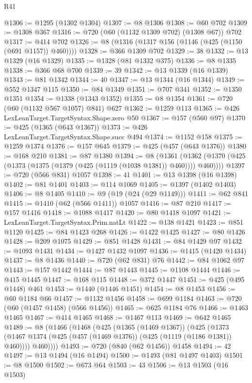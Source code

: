 \begin{lexlean}{R41}
\begin{coremodule}
{{{{{{{{{{{{{{{{{{{{{{{{{{{{{{{{{{{{{{{{{{{{{{{{{{{{{{{{{{{{{{{{{{{{{{{{{{{{{{{{{{{{{{{@1306 := @1295 (@1302 @1304)
@1307 := @8 @1306
@1308 := @60 @702
@1309 := @1308 @367
@1316 := @720 (@60 (@1132 @1309 @702) (@1308 @67)) @702
@1317 := @414 @702
@1326 := @8 (@1316 (@1317 @156 (@1146 (@425 (@1150 (@691 @1157)) @460))))
@1328 := @366 @1309 @702
@1329 := 38
@1332 := @13 @1329 (@16 @1329)
@1335 := @1328 (@81 @1332 @375)
@1336 := @8 @1335
@1338 := @366 @68 @700
@1339 := 39
@1342 := @13 @1339 (@16 @1339)
@1343 := @81 @1342
@1344 := 40
@1347 := @13 @1344 (@16 @1344)
@1349 := @552 @1347 @115
@1350 := @84 @1349
@1351 := @707 @341
@1352 := @1350 @1351
@1354 := @1338 (@1343 @1352)
@1355 := @8 @1354
@1361 := @720 (@60 (@1132 @567 @1057) @841) @627
@1362 := @1259 @113
@1365 := @426 LexLeanTarget.TargetSyntax.Shape.zero @50
@1367 := @157 (@560 @97)
@1370 := @425 (@1365 (@643 @1367))
@1373 := @426 LexLeanTarget.TargetSyntax.Shape.succ @494
@1374 := @1152 @158
@1375 := @1259 @1374
@1376 := @157 @645
@1379 := @425 (@457 (@643 @1376))
@1380 := @168 @210
@1381 := @87 @1380
@1394 := @8
    (@1361 (@1362 (@1370 (@425 (@1373 (@1375 (@1379 (@425 (@1119 (@1038 @1381)) @460)))) @460))))
@1397 := @720 (@566 @831) @1057
@1398 := 41
@1401 := @13 @1398 (@16 @1398)
@1402 := @81 @1401
@1403 := @114 @1069
@1405 := @1397 (@1402 @1403)
@1406 := @8 @1405
@1410 := @9 (@19 (@24 (@29 @1149)))
@1411 := @62 @841
@1415 := @1410 (@62 (@566 @1411)) @1057
@1416 := @87 @210
@1417 := @157 @1416
@1418 := @1088 @1417
@1420 := @80 @1418 @1097
@1421 := LexLeanTarget.TargetSyntax.Prim.natLt
@1422 := @138 @1421
@1423 := @851 @1120
@1425 := @84 @1423 @268
@1426 := @1422 @1425
@1427 := @80 @1426
@1428 := @209 @1075
@1429 := @851 @1428
@1431 := @84 @1429 @97
@1432 := @1093 @1431
@1434 := @1427 @1432 @1097
@1436 := @1415 (@1420 @1434)
@1437 := @8 @1436
@1440 := @720 (@62 @831) @76
@1442 := @84 @1062 @97
@1443 := @157 @1442
@1444 := @87 @1443
@1445 := @1108 @1444
@1446 := @415 @1445
@1447 := @168 @115
@1448 := @372 @1447
@1451 := @425 (@495 @1448) @461
@1453 := @1440 (@1446 @1451)
@1454 := @8 @1453
@1456 := @60 @1184 @66
@1457 := @1132 @1456
@1458 := @699 @1184
@1463 := @720 (@60 (@1457 @1458) (@566 @1456))
@1465 := @625 @1184 @76
@1466 := @1463 @1465
@1467 := @414 @1465
@1468 := @1467 @113
@1469 := @642 @1465
@1489 := @8
    (@1466
      (@1468
        (@425
          (@1365 (@1469 @1367))
          (@425
            (@1373 (@1467 @1374 (@425 (@457 (@1469 @1376)) (@425 (@1119 (@1186 @1381)) @460))))
            @460))))
@1493 := @720 (@840 (@62 @1456)) @1458
@1494 := 42
@1497 := @13 @1494 (@16 @1494)
@1500 := @1493 (@81 @1497 @1403)
@1501 := @8 @1500
@1502 := @673 @64
@1503 := 43
@1506 := @13 @1503 (@16 @1503)
}}}}}}}}}}}}}}}}}}}}}}}}}}}}}}}}}}}}}}}}}}}}}}}}}}}}}}}}}}}}}}}}}}}}}}}}}}}}}}}}}}}}}}}
\end{coremodule}
\end{lexlean}

